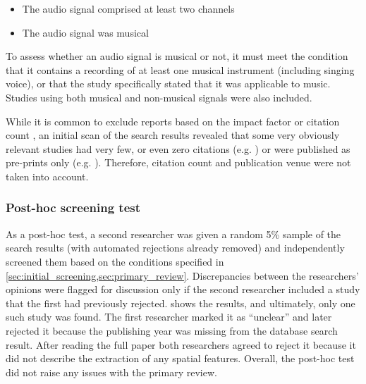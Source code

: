 \documentclass[referee,pdflatex,sn-mathphys-num]{sn-jnl}%
\newcommand{\q}[1]{\enquote{#1}}
\begin{document}
\begin{itemize}
    \item The audio signal comprised at least two channels
    \item The audio signal was musical
\end{itemize}

To assess whether an audio signal is musical or not, it must meet the condition that it contains a recording of at least one musical instrument (including singing voice), or that the study specifically stated that it was applicable to music. Studies using both musical and non-musical signals were also included.

While it is common to exclude reports based on the impact factor or citation count \cite{carrera-riveraHowtoConductSystematic2022}, an initial scan of the search results revealed that some very obviously relevant studies had very few, or even zero citations (e.g. \cite{yangUpmixingStyleTransfer2022}) or were published as pre-prints only (e.g. \cite{ziemerGoniometersArePowerful2023}). Therefore, citation count and publication venue were not taken into account.

\subsubsection{Post-hoc screening test}
\label{sec:post_hoc_review}
As a post-hoc test, a second researcher was given a random 5\% sample of the search results (with automated rejections already removed) and independently screened them based on the conditions specified in \cref{sec:initial_screening,sec:primary_review}. Discrepancies between the researchers' opinions were flagged for discussion only if the second researcher included a study that the first had previously rejected.  shows the results, and ultimately, only one such study \cite{einbondInstrumentalRadiationPatterns2021} was found. The first researcher marked it as \q{unclear} and later rejected it because the publishing year was missing from the database search result. After reading the full paper both researchers agreed to reject it because it did not describe the extraction of any spatial features. Overall, the post-hoc test did not raise any issues with the primary review.

\begin{table}[htb]
  \centering
  \caption{Results of post-hoc screening test}
  
  \label{tab:posthoc}
\end{table}
\end{document}
